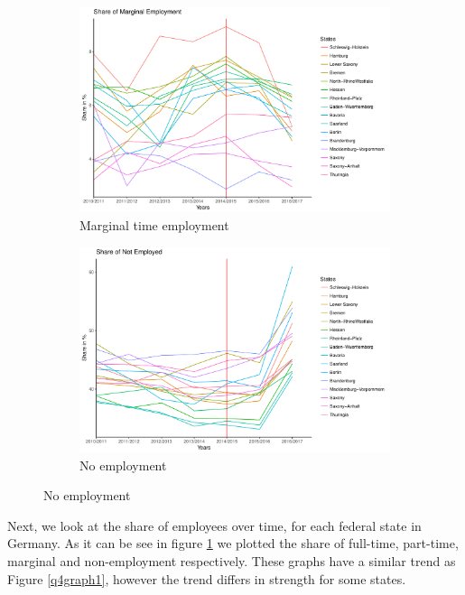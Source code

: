 \documentclass[a4paper]{article}
\begin{document}
\begin{figure}
\begin{subfigure}[h]{0.5\linewidth}
\includegraphics[width=\textwidth]{q4/growthmarginal.pdf}
\caption{Marginal time employment}
\end{subfigure}
\hfill
\begin{subfigure}[h]{0.5\linewidth}
\includegraphics[width=\textwidth]{q4/growthnot.pdf}
\caption{No employment}
\end{subfigure}%
\label{q4graph2}
\end{figure}
%
\newline
Next, we look at the share of employees over time, for each federal state in Germany. As it can be see in figure \ref{q4graph2} we plotted the share of full-time, part-time, marginal and non-employment respectively. These graphs have a similar trend as Figure \ref{q4graph1}, however the trend differs in strength for some states. \newline
\end{document}

